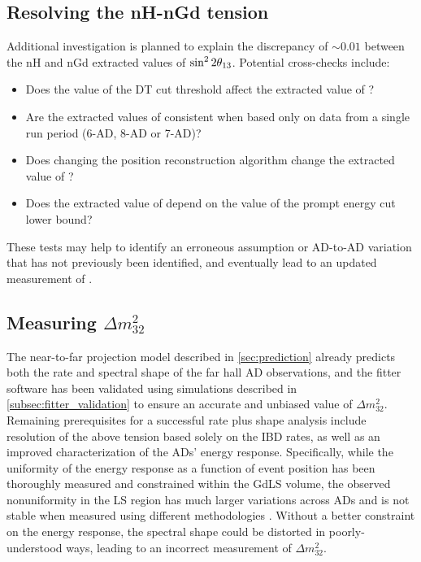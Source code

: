 \subsection{Resolving the nH-nGd tension}
\label{subsec:tension}

Additional investigation is planned to explain the discrepancy
of $\sim0.01$ between the nH and nGd extracted values of $\sin^22\theta_{13}$.
Potential cross-checks include:
\begin{itemize}
    \item Does the value of the DT cut threshold affect the extracted value of
        \thetaot{}?
    \item Are the extracted values of \thetaot{} consistent when
        based only on data from a single run period (6-AD, 8-AD or 7-AD)?
    \item Does changing the position reconstruction algorithm
        change the extracted value of \thetaot{}?
    \item Does the extracted value of \thetaot{} depend on
        the value of the prompt energy cut lower bound?
\end{itemize}
These tests may help to identify an erroneous assumption
or AD-to-AD variation that has not previously been identified,
and eventually lead to an updated measurement of \thetaot{}.


\subsection{Measuring \texorpdfstring{$\Delta m^2_{32}$}{the 3,2 mass splitting}}
\label{subsec:rateplusshape}

The near-to-far projection model described in \cref{sec:prediction}
already predicts both the rate and spectral shape
of the far hall AD observations,
and the fitter software has been validated using simulations
described in \cref{subsec:fitter_validation}
to ensure an accurate and unbiased value of $\Delta m^2_{32}$.
Remaining prerequisites for a successful rate plus shape analysis
include resolution of the above tension based solely on the IBD rates,
as well as an improved characterization of the ADs' energy response.
Specifically, while the uniformity of the energy response
as a function of event position
has been thoroughly measured and constrained within the GdLS volume,
the observed nonuniformity in the LS region
has much larger variations across ADs
and is not stable when measured using different methodologies \cite{beda_nonuniformity}.
Without a better constraint on the energy response,
the spectral shape could be distorted in poorly-understood ways,
leading to an incorrect measurement of $\Delta m^2_{32}$.
